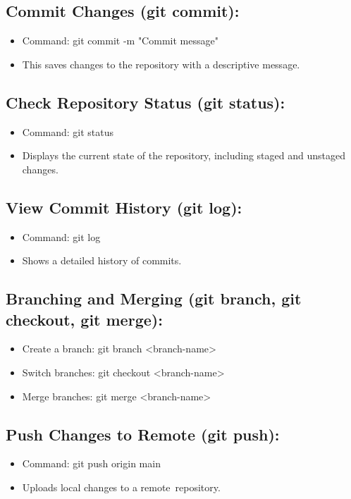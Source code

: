 \documentclass{article}
\begin{document}
\subsection{Commit Changes (git commit):}
\begin{itemize}
    \item Command: git commit -m "Commit message"
\item This saves changes to the repository with a descriptive message.
\end{itemize}
\subsection{Check Repository Status (git status):}
\begin{itemize}
    \item Command: git status
     \item Displays the current state of the repository, including staged and unstaged changes.
\end{itemize}
\subsection{View Commit History (git log):}
\begin{itemize}
    \item Command: git log
\item Shows a detailed history of commits.
\end{itemize}

\subsection{Branching and Merging (git branch, git checkout, git merge):}
\begin{itemize}
    \item Create a branch: git branch <branch-name>
\item Switch branches: git checkout <branch-name>
 \item Merge branches: git merge <branch-name>
\end{itemize}
\subsection{
Push Changes to Remote (git push):}
\begin{itemize}
    \item Command: git push origin main
     \item Uploads local changes to a remote repository.
\end{itemize}
\end{document}
